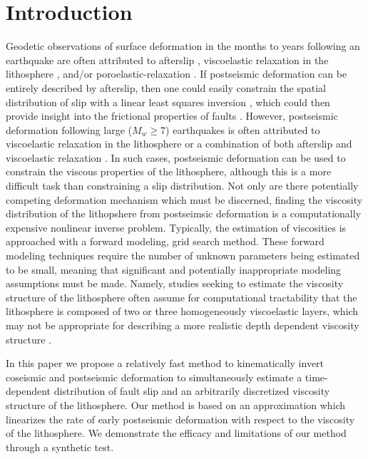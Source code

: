 \documentclass[extra,mreferee]{gji}
\begin{document}
\section{Introduction}
Geodetic observations of surface deformation in the months to years
following an earthquake are often attributed to afterslip
\citep[e.g.][]{M1991}, viscoelastic relaxation in the lithosphere
\citep[e.g.][]{NM1974}, and/or poroelastic-relaxation
\citep[e.g.][]{P1998,J2003}.  If postseismic deformation can be
entirely described by afterslip, then one could easily constrain the
spatial distribution of slip with a linear least squares inversion
\citep[e.g.][]{H1987,B2002,F2007}, which could then provide insight
into the frictional properties of faults \citep[e.g.][]{H2006,B2009}.
However, postseismic deformation following large ($M_w\geq$7)
earthquakes is often attributed to viscoelastic relaxation in the
lithosphere \citep[e.g.][]{HH2003,P2003,P2005} or a combination of
both afterslip and viscoelastic relaxation
\citep[e.g.][]{F2006,H2009,J2009,R2015}.  In such cases, postseismic
deformation can be used to constrain the viscous properties of the
lithosphere, although this is a more difficult task than constraining
a slip distribution.  Not only are there potentially competing
deformation mechanism which must be discerned, finding the viscosity
distribution of the lithopshere from postseimsic deformation is a
computationally expensive nonlinear inverse problem.  Typically, the
estimation of viscosities is approached with a forward modeling, grid
search method.  These forward modeling techniques require the number
of unknown parameters being estimated to be small, meaning that
significant and potentially inappropriate modeling assumptions must be
made.  Namely, studies seeking to estimate the viscosity structure of
the lithosphere often assume for computational tractability that the
lithosphere is composed of two or three homogeneously viscoelastic
layers, which may not be appropriate for describing a more realistic
depth dependent viscosity structure \citep{RG2008,H2013}.

In this paper we propose a relatively fast method to kinematically
invert coseismic and postseismic deformation to simultaneously
estimate a time-dependent distribution of fault slip and an
arbitrarily discretized viscosity structure of the lithosphere.  Our
method is based on an approximation which linearizes the rate of early
postseismic deformation with respect to the viscosity of the
lithosphere.  We demonstrate the efficacy and limitations of our
method through a synthetic test.
\end{document}
